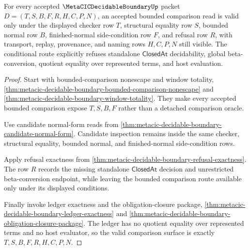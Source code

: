 \begin{theorem}
\label{thm:metacic-decidable-boundary-conditional-obligation}
For every accepted $\MetaCICDecidableBoundaryUp$ packet $D=(T,S,B,F,R,H,C,P,N)$, an accepted bounded comparison read is valid only under the displayed checker row $T$, structural equality row $S$, bounded normal row $B$, finished-normal side-condition row $F$, and refusal row $R$, with transport, replay, provenance, and naming rows $H,C,P,N$ still visible. The conditional route explicitly refuses standalone $\mathsf{ClosedAt}$ decidability, global beta-conversion, quotient equality over represented terms, and host evaluation.
\end{theorem}
\begin{proof}
Start with bounded-comparison nonescape and window totality, \autoref{thm:metacic-decidable-boundary-bounded-comparison-nonescape} and \autoref{thm:metacic-decidable-boundary-window-totality}. They make every accepted bounded comparison expose $T,S,B,F$ rather than a detached comparison oracle.

Use candidate normal-form reads from \autoref{thm:metacic-decidable-boundary-candidate-normal-form}. Candidate inspection remains inside the same checker, structural equality, bounded normal, and finished-normal side-condition rows.

Apply refusal exactness from \autoref{thm:metacic-decidable-boundary-refusal-exactness}. The row $R$ records the missing standalone $\mathsf{ClosedAt}$ decision and unrestricted beta-conversion endpoint, while leaving the bounded comparison route available only under its displayed conditions.

Finally invoke ledger exactness and the obligation-closure package, \autoref{thm:metacic-decidable-boundary-ledger-exactness} and \autoref{thm:metacic-decidable-boundary-obligation-closure-package}. The ledger has no quotient equality over represented terms and no host evaluator, so the valid comparison surface is exactly $T,S,B,F,R,H,C,P,N$.
\end{proof}


